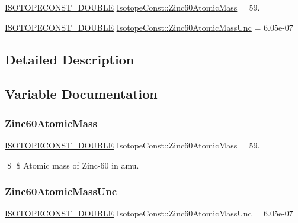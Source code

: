 \begin{DoxyCompactItemize}
\item 
\mbox{\hyperlink{group___isotope_const-_macros_ga8f45a7272ce02c0b4c65c44636ed719a}{I\+S\+O\+T\+O\+P\+E\+C\+O\+N\+S\+T\+\_\+\+D\+O\+U\+B\+LE}} \mbox{\hyperlink{group___isotope_const-_zinc-_zn60_gac8e470bc47519de03b5193aa75bb480f}{Isotope\+Const\+::\+Zinc60\+Atomic\+Mass}} = 59.
\item 
\mbox{\hyperlink{group___isotope_const-_macros_ga8f45a7272ce02c0b4c65c44636ed719a}{I\+S\+O\+T\+O\+P\+E\+C\+O\+N\+S\+T\+\_\+\+D\+O\+U\+B\+LE}} \mbox{\hyperlink{group___isotope_const-_zinc-_zn60_ga0859d419da37a3af49ecb7003bdc4f07}{Isotope\+Const\+::\+Zinc60\+Atomic\+Mass\+Unc}} = 6.\+05e-\/07
\end{DoxyCompactItemize}


\subsection{Detailed Description}


\subsection{Variable Documentation}
\mbox{\label{group___isotope_const-_zinc-_zn60_gac8e470bc47519de03b5193aa75bb480f}} 
\subsubsection{\texorpdfstring{Zinc60\+Atomic\+Mass}{Zinc60AtomicMass}}
{\footnotesize\ttfamily \mbox{\hyperlink{group___isotope_const-_macros_ga8f45a7272ce02c0b4c65c44636ed719a}{I\+S\+O\+T\+O\+P\+E\+C\+O\+N\+S\+T\+\_\+\+D\+O\+U\+B\+LE}} Isotope\+Const\+::\+Zinc60\+Atomic\+Mass = 59.}

\$ \$ Atomic mass of Zinc-\/60 in amu. \mbox{\label{group___isotope_const-_zinc-_zn60_ga0859d419da37a3af49ecb7003bdc4f07}} 
\subsubsection{\texorpdfstring{Zinc60\+Atomic\+Mass\+Unc}{Zinc60AtomicMassUnc}}
{\footnotesize\ttfamily \mbox{\hyperlink{group___isotope_const-_macros_ga8f45a7272ce02c0b4c65c44636ed719a}{I\+S\+O\+T\+O\+P\+E\+C\+O\+N\+S\+T\+\_\+\+D\+O\+U\+B\+LE}} Isotope\+Const\+::\+Zinc60\+Atomic\+Mass\+Unc = 6.\+05e-\/07}

